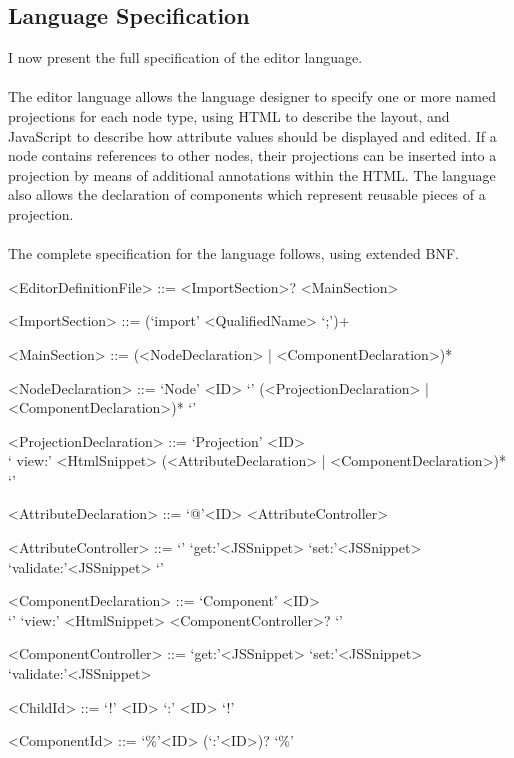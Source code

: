 \documentclass{article}
\begin{document}
{\subsection{Language Specification}
I now present the full specification of the editor language. 
\\
\\
The editor language allows the language designer to specify one or more named projections for each node type, using HTML to describe the layout, and JavaScript to describe how attribute values should be displayed and edited. If a node contains references to other nodes, their projections can be inserted into a projection by means of additional annotations within the HTML. The language also allows the declaration of components which represent reusable pieces of a projection. 
\\
\\
The complete specification for the language follows, using extended BNF.

\setlength{\grammarparsep}{12pt plus 1pt minus 1pt} %
\setlength{\grammarindent}{5em} %

\begin{grammar}

<EditorDefinitionFile> ::= <ImportSection>? <MainSection>

<ImportSection> ::= (`import' <QualifiedName> `;')+ 

<MainSection> ::= (<NodeDeclaration> | <ComponentDeclaration>)*

<NodeDeclaration> ::= `Node' <ID> `{' (<ProjectionDeclaration> | <ComponentDeclaration>)* `}'

<ProjectionDeclaration> ::= `Projection' <ID> \\ `{ view:' <HtmlSnippet> (<AttributeDeclaration> | <ComponentDeclaration>)* `}'

<AttributeDeclaration> ::= `@'<ID> <AttributeController>

<AttributeController> ::= `{' `get:'<JSSnippet> `set:'<JSSnippet> `validate:'<JSSnippet> `}'

<ComponentDeclaration> ::= `Component' <ID> \\`{' `view:' <HtmlSnippet> <ComponentController>? `}'

<ComponentController> ::= `get:'<JSSnippet> `set:'<JSSnippet> `validate:'<JSSnippet> 
 
<ChildId> ::= `!' <ID> `:' <ID> `!'
 
<ComponentId> ::= `\%'<ID> (`:'<ID>)? `\%'


\end{grammar}}
\end{document}
